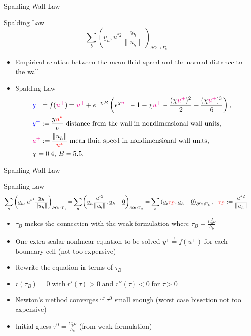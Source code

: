 \documentclass[9pt,compress,t,aspectratio=169]{beamer}
\newcommand{\scprb}[2]{\sum_b \left(#1,#2\right)_{\partial\Omega \cap \Gamma_b }}
\newcommand{\red}[1]{\textcolor{red}{#1}}
\newcommand{\blue}[1]{\textcolor{blue}{#1}}
\newcommand{\magenta}[1]{\textcolor{magenta}{#1}}
\newcommand{\ww}[1]{\underline{#1}}
\newcommand{\1}{\begin{pmatrix}
		1\\
		1
\end{pmatrix}}
\renewcommand{\vec}[1]{\ww{#1}}
\newcommand{\highlight}[1]{\textbf{\color{bluemathlab}#1}}
\newcommand{\highlightB}[1]{\textbf{\color{black!15!orangemathlab}#1}}
\begin{document}
\begin{frame}{Spalding Wall Law}
		\begin{block}{Spalding Law}
			\begin{equation*}
				\scprb{\vec{v}_h}{u^{*2}\frac{\vec{u}_h}{\lVert \vec{u}_h \rVert}}
			\end{equation*}
			\begin{itemize}
				\item Empirical relation between the mean fluid speed and the normal distance to the wall
				\item Spalding Law
				\begin{align*}
					& \blue{y^+ } \stackrel{!}{=} f(\magenta{u^+}) = \magenta{u^+} + e^{-\chi B}\left(e^{\chi \magenta{u^+}}-1-\chi \magenta{u^+}-\frac{(\chi \magenta{u^+})^2}{2} -\frac{(\chi \magenta{u^+})^3}{6}\right),\\
					&\blue{y^+ }:= \frac{y\red{u^*}}{\nu} \text{ distance from the wall in nondimensional wall units,}\\
					&\magenta{u^+}:=\frac{\lVert \vec{u}_h \rVert}{\red{u^*}} \text{ mean fluid speed in nondimensional wall units,}\\
					&\chi = 0.4,\, B =5.5.
				\end{align*}
			\end{itemize}
		\end{block}
\end{frame}

\begin{frame}{Spalding Wall Law}
	\begin{block}{Spalding Law}
		\begin{align*}
			\scprb{\vec{v}_h}{u^{*2}\frac{\vec{u}_h}{\lVert \vec{u}_h \rVert}} =&\scprb{\vec{v}_h\frac{u^{*2}}{\lVert \vec{u}_h \rVert}}{\vec{u}_h-\vec{0}} = \scprb{\vec{v}_h\red{\tau_B}}{\vec{u}_h-\vec{0}},
			&\red{\tau_B}:=\frac{u^{*2}}{\lVert \vec{u}_h \rVert}
		\end{align*}
		\begin{itemize}
			\item \highlight{$\tau_B$} makes the connection with the weak formulation where $\tau_B= \frac{C_b^I \nu}{h_b}$
			\item One extra scalar nonlinear equation to be solved ${y^+ } \stackrel{!}{=} f({u^+})$ for each boundary cell (not too expensive)
			\item Rewrite the equation in terms of $\tau_B$
			\item \highlightB{$r(\tau_B)=0$} with $r'(\tau)>0$ and  $r''(\tau)<0$ for $\tau>0$
			\item Newton's method converges if $\tau^0$ small enough (worst case bisection not too expensive)
			\item Initial guess $\tau^0= \frac{C_b^I \nu}{h_b}$ (from weak formulation)
		\end{itemize}
	\end{block}
\end{frame}
\end{document}
